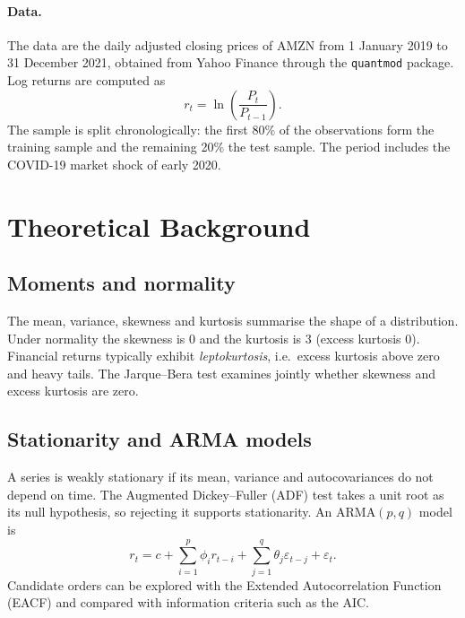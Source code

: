 \documentclass[11pt,a4paper]{article}
\begin{document}
\paragraph{Data.} The data are the daily adjusted closing prices of AMZN from 1 January 2019 to 31 December 2021, obtained from Yahoo Finance through the \texttt{quantmod} package. Log returns are computed as
\begin{equation}
  r_t = \ln\!\left(\frac{P_t}{P_{t-1}}\right).
\end{equation}
The sample is split chronologically: the first 80\% of the observations form the training sample and the remaining 20\% the test sample. The period includes the COVID-19 market shock of early 2020.

\section{Theoretical Background}

\subsection{Moments and normality}
The mean, variance, skewness and kurtosis summarise the shape of a distribution. Under normality the skewness is $0$ and the kurtosis is $3$ (excess kurtosis $0$). Financial returns typically exhibit \emph{leptokurtosis}, i.e.\ excess kurtosis above zero and heavy tails. The Jarque--Bera test \cite{jarque1980} examines jointly whether skewness and excess kurtosis are zero.

\subsection{Stationarity and ARMA models}
A series is weakly stationary if its mean, variance and autocovariances do not depend on time. The Augmented Dickey--Fuller (ADF) test \cite{dickey1979} takes a unit root as its null hypothesis, so rejecting it supports stationarity. An $\mathrm{ARMA}(p,q)$ model is
\begin{equation}
  r_t = c + \sum_{i=1}^{p}\phi_i r_{t-i} + \sum_{j=1}^{q}\theta_j \varepsilon_{t-j} + \varepsilon_t .
\end{equation}
Candidate orders can be explored with the Extended Autocorrelation Function (EACF) and compared with information criteria such as the AIC.
\end{document}
